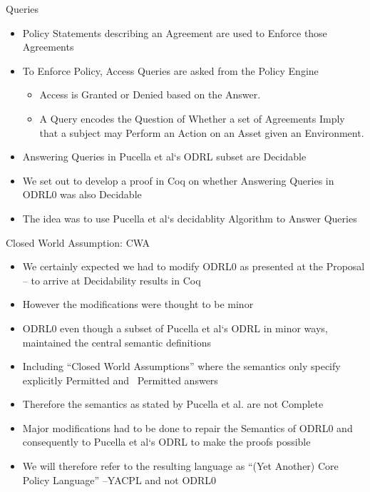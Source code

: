 \documentclass{beamer}
\begin{document}
\begin{frame}[fragile]{Queries}
\begin{itemize}
\item Policy Statements describing an Agreement are used to Enforce those Agreements 
\item To Enforce Policy, Access Queries are asked from the Policy Engine
    \begin{itemize}
       \item Access is Granted or Denied based on the Answer.
       \item A Query encodes the Question of Whether a set of Agreements Imply that a subject may Perform an Action on an Asset given an Environment.
     \end{itemize}
\item Answering Queries in Pucella et al`s ODRL subset are Decidable
\item We set out to develop a proof in Coq on whether Answering Queries in ODRL0 was also Decidable
\item The idea was to use Pucella et al`s decidablity Algorithm to Answer Queries
\end{itemize}
\end{frame}
\begin{frame}[fragile]{Closed World Assumption: CWA}
\begin{itemize}
\item We certainly expected we had to modify ODRL0 as presented at the Proposal -- to arrive at Decidability results in Coq
\item However the modifications were thought to be minor
\item ODRL0 even though a subset of Pucella et al`s ODRL in minor ways, maintained the central semantic definitions
\item Including ``Closed World Assumptions'' where the semantics only specify explicitly Permitted and ~Permitted answers
\item Therefore the semantics as stated by Pucella et al. are not Complete
\item Major modifications had to be done to repair the Semantics of ODRL0 and consequently to Pucella et al`s ODRL to make the proofs possible
\item We will therefore refer to the resulting language as ``(Yet Another) Core Policy Language''  --YACPL and not ODRL0 
\end{itemize}
\end{frame}
\end{document}

